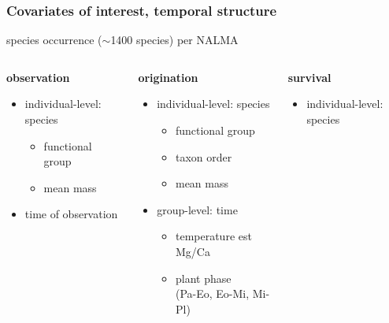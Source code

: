 \documentclass[aspectratio=169]{beamer}
\begin{document}
\begin{frame}
  \frametitle{Covariates of interest, temporal structure}

  \begin{center}
    \large{species occurrence (\(\sim\)1400 species) per NALMA}
  \end{center}

  \vspace*{0.05\textheight}

  \begin{columns}
    \begin{column}[T]{0.3\textwidth}
      \textbf{observation}
      \begin{itemize}
        \item individual-level: species
          \begin{itemize}
            \item functional group
            \item mean mass
          \end{itemize}
        \item time of observation
      \end{itemize}
    \end{column}
    \begin{column}[T]{0.3\textwidth}
      \textbf{origination}
      \begin{itemize}
        \item individual-level: species
          \begin{itemize}
            \item functional group
            \item taxon order
            \item mean mass
          \end{itemize}
        \item group-level: time
          \begin{itemize}
            \item temperature est Mg/Ca
            \item plant phase \\(Pa-Eo, Eo-Mi, Mi-Pl)
          \end{itemize}
      \end{itemize}
    \end{column}
    \begin{column}[T]{0.3\textwidth}
      \textbf{survival}
      \begin{itemize}
        \item individual-level: species

\end{itemize}
\end{column}
\end{columns}
\end{frame}
\end{document}
